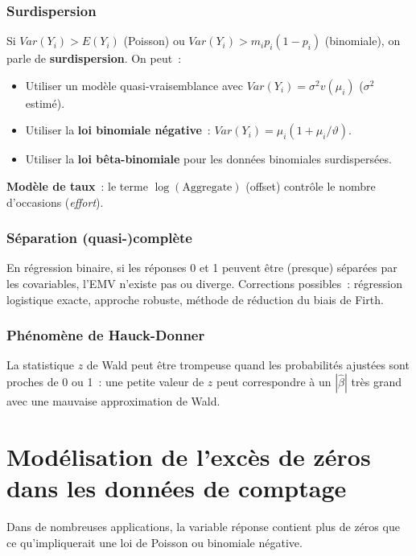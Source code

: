 \documentclass[11pt,letterpaper]{article}
\begin{document}
\subsubsection{Surdispersion}
Si $Var(Y_i) > E(Y_i)$ (Poisson) ou $Var(Y_i) > m_i p_i(1-p_i)$ (binomiale), on parle de \textbf{surdispersion}. On peut~:
\begin{itemize}
\item Utiliser un modèle quasi-vraisemblance avec $Var(Y_i) = \sigma^2 v(\mu_i)$ ($\sigma^2$ estimé).
\item Utiliser la \textbf{loi binomiale négative}~: $Var(Y_i) = \mu_i(1 + \mu_i/\vartheta)$.
\item Utiliser la \textbf{loi bêta-binomiale} pour les données binomiales surdispersées.
\end{itemize}

\textbf{Modèle de taux}~: le terme $\log(\text{Aggregate})$ (offset) contrôle le nombre d'occasions (\textit{effort}).

\subsubsection{Séparation (quasi-)complète}
En régression binaire, si les réponses 0 et 1 peuvent être (presque) séparées par les covariables, l'EMV n'existe pas ou diverge. Corrections possibles~: régression logistique exacte, approche robuste, méthode de réduction du biais de Firth.

\subsubsection{Phénomène de Hauck-Donner}
La statistique $z$ de Wald peut être trompeuse quand les probabilités ajustées sont proches de 0 ou 1~: une petite valeur de $z$ peut correspondre à un $|\hat{\beta}|$ très grand avec une mauvaise approximation de Wald.

\newpage
\section{Modélisation de l'excès de zéros dans les données de comptage}

Dans de nombreuses applications, la variable réponse contient plus de zéros que ce qu'impliquerait une loi de Poisson ou binomiale négative.
\end{document}
